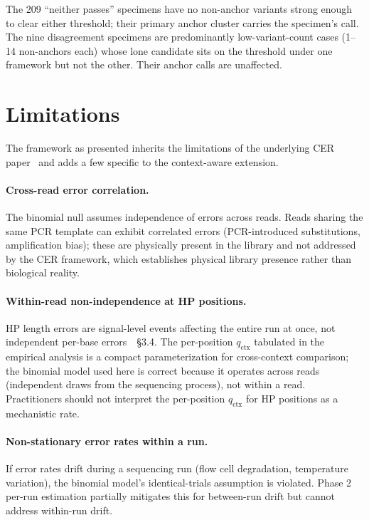 \documentclass[11pt]{article}
\begin{document}
The 209 ``neither passes'' specimens have no non-anchor variants strong
enough to clear either threshold; their primary anchor cluster carries the
specimen's call. The nine disagreement specimens are predominantly
low-variant-count cases (1--14 non-anchors each) whose lone candidate sits
on the threshold under one framework but not the other. Their anchor calls
are unaffected.

\section{Limitations}

The framework as presented inherits the limitations of the underlying CER
paper~\cite{cer_paper} and adds a few specific to the context-aware extension.

\paragraph{Cross-read error correlation.} The binomial null assumes
independence of errors across reads. Reads sharing the same PCR template can
exhibit correlated errors (PCR-introduced substitutions, amplification bias);
these are physically present in the library and not addressed by the CER
framework, which establishes physical library presence rather than biological
reality.

\paragraph{Within-read non-independence at HP positions.} HP length errors are
signal-level events affecting the entire run at once, not independent per-base
errors~\cite{hp_paper}~\S 3.4. The per-position $q_\text{ctx}$ tabulated in
the empirical analysis is a compact parameterization for cross-context
comparison; the binomial model used here is correct because it operates
across reads (independent draws from the sequencing process), not within a
read. Practitioners should not interpret the per-position $q_\text{ctx}$ for
HP positions as a mechanistic rate.

\paragraph{Non-stationary error rates within a run.} If error rates drift
during a sequencing run (flow cell degradation, temperature variation), the
binomial model's identical-trials assumption is violated. Phase 2 per-run
estimation partially mitigates this for between-run drift but cannot address
within-run drift.
\end{document}

